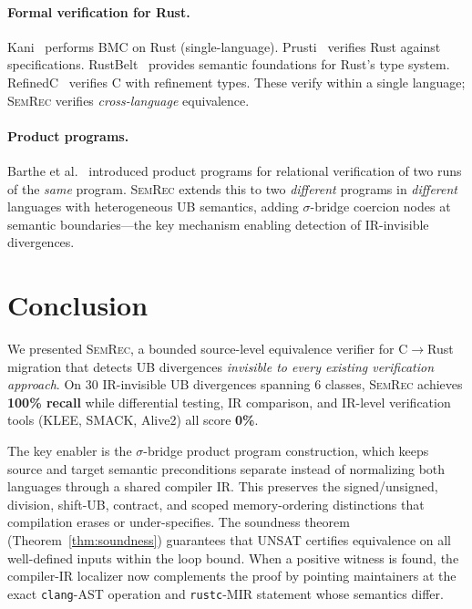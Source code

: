 \documentclass[10pt,a4paper]{article}
\begin{document}
\paragraph{Formal verification for Rust.}
Kani~\cite{kani2022} performs BMC on Rust (single-language).
Prusti~\cite{astrauskas2022prusti} verifies Rust against
specifications.  RustBelt~\cite{jung2017rustbelt} provides semantic
foundations for Rust's type system.
RefinedC~\cite{sammler2021refinedc} verifies C with refinement types.
These verify within a single language; \textsc{SemRec} verifies
\emph{cross-language} equivalence.

\paragraph{Product programs.}
Barthe et al.~\cite{barthe2011product} introduced product programs
for relational verification of two runs of the \emph{same} program.
\textsc{SemRec} extends this to two \emph{different} programs in
\emph{different} languages with heterogeneous UB semantics,
adding $\sigma$-bridge coercion nodes at semantic boundaries---the
key mechanism enabling detection of IR-invisible divergences.


\section{Conclusion}\label{sec:conclusion}

We presented \textsc{SemRec}, a bounded source-level equivalence
verifier for C$\to$Rust migration that detects UB divergences
\emph{invisible to every existing verification approach}.  On 30
IR-invisible UB divergences spanning 6 classes, \textsc{SemRec}
achieves \textbf{100\% recall} while differential testing, IR
comparison, and IR-level verification tools (KLEE, SMACK, Alive2)
all score \textbf{0\%}.

The key enabler is the $\sigma$-bridge product program construction,
which keeps source and target semantic preconditions separate instead of
normalizing both languages through a shared compiler IR.  This preserves the
signed/unsigned, division, shift-UB, contract, and scoped memory-ordering
distinctions that compilation erases or under-specifies.  The soundness theorem
(Theorem~\ref{thm:soundness})
guarantees that UNSAT certifies equivalence on all well-defined
inputs within the loop bound.
When a positive witness is found, the compiler-IR localizer now complements the
proof by pointing maintainers at the exact \texttt{clang}-AST operation and
\texttt{rustc}-MIR statement whose semantics differ.
\end{document}
